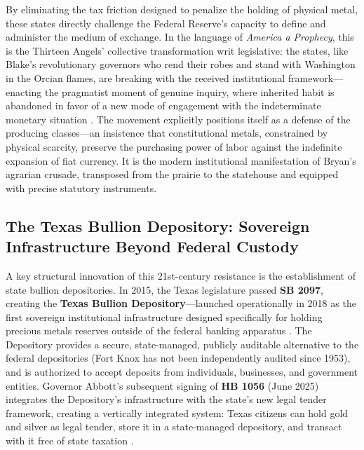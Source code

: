 \documentclass[
]{article}
\begin{document}
By eliminating the tax friction designed to penalize the holding of
physical metal, these states directly challenge the Federal Reserve's
capacity to define and administer the medium of exchange. In the
language of \emph{America a Prophecy}, this is the Thirteen Angels'
collective transformation writ legislative: the states, like Blake's
revolutionary governors who rend their robes and stand with Washington
in the Orcian flames, are breaking with the received institutional
framework---enacting the pragmatist moment of genuine inquiry, where
inherited habit is abandoned in favor of a new mode of engagement with
the indeterminate monetary situation \citep{friedman2026blake}. The
movement explicitly positions itself as a defense of the producing
classes---an insistence that constitutional metals, constrained by
physical scarcity, preserve the purchasing power of labor against the
indefinite expansion of fiat currency. It is the modern institutional
manifestation of Bryan's agrarian crusade, transposed from the prairie
to the statehouse and equipped with precise statutory instruments.

\subsection{The Texas Bullion Depository: Sovereign Infrastructure
Beyond Federal
Custody}\label{the-texas-bullion-depository-sovereign-infrastructure-beyond-federal-custody}

A key structural innovation of this 21st-century resistance is the
establishment of state bullion depositories. In 2015, the Texas
legislature passed \textbf{SB 2097}, creating the \textbf{Texas Bullion
Depository}---launched operationally in 2018 as the first sovereign
institutional infrastructure designed specifically for holding precious
metals reserves outside of the federal banking apparatus
\citep{texas2015depository}. The Depository provides a secure,
state-managed, publicly auditable alternative to the federal
depositories (Fort Knox has not been independently audited since 1953),
and is authorized to accept deposits from individuals, businesses, and
government entities. Governor Abbott's subsequent signing of \textbf{HB
1056} (June 2025) integrates the Depository's infrastructure with the
state's new legal tender framework, creating a vertically integrated
system: Texas citizens can hold gold and silver as legal tender, store
it in a state-managed depository, and transact with it free of state
taxation \citep{texas2025legaltender}.
\end{document}
